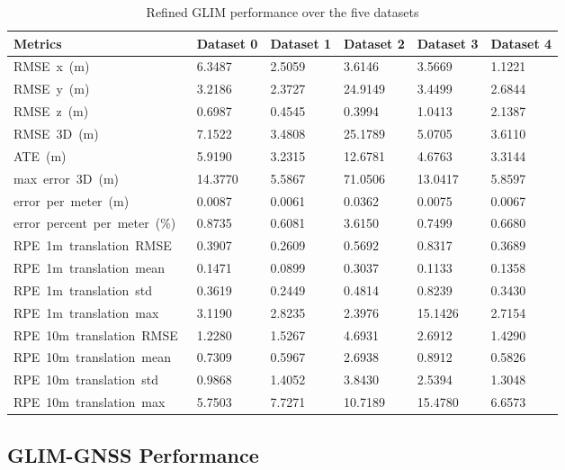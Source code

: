 \begin{table}[htbp]
\centering
\caption{Refined GLIM performance over the five datasets}
\label{tab:refined_performance}
\begin{tabularx}{\textwidth}{lXXXXX}
\toprule
\textbf{Metrics} & \textbf{Dataset 0} & \textbf{Dataset 1} & \textbf{Dataset 2} & \textbf{Dataset 3} & \textbf{Dataset 4} \\ \midrule
RMSE\ x\ (m)\ & 6.3487 & 2.5059 & 3.6146 & 3.5669 & 1.1221 \\
RMSE\ y\ (m)\ & 3.2186 & 2.3727 & 24.9149 & 3.4499 & 2.6844 \\
RMSE\ z\ (m)\ & 0.6987 & 0.4545 & 0.3994 & 1.0413 & 2.1387 \\
RMSE\ 3D\ (m)\ & 7.1522 & 3.4808 & 25.1789 & 5.0705 & 3.6110 \\
ATE\ (m)\ & 5.9190 & 3.2315 & 12.6781 & 4.6763 & 3.3144 \\
max\ error\ 3D\ (m)\ & 14.3770 & 5.5867 & 71.0506 & 13.0417 & 5.8597 \\
error\ per\ meter\ (m)\ & 0.0087 & 0.0061 & 0.0362 & 0.0075 & 0.0067 \\
error\ percent\ per\ meter\ (\%)\ & 0.8735 & 0.6081 & 3.6150 & 0.7499 & 0.6680 \\
RPE\ 1m\ translation\ RMSE\ & 0.3907 & 0.2609 & 0.5692 & 0.8317 & 0.3689 \\
RPE\ 1m\ translation\ mean\ & 0.1471 & 0.0899 & 0.3037 & 0.1133 & 0.1358 \\
RPE\ 1m\ translation\ std\ & 0.3619 & 0.2449 & 0.4814 & 0.8239 & 0.3430 \\
RPE\ 1m\ translation\ max\ & 3.1190 & 2.8235 & 2.3976 & 15.1426 & 2.7154 \\
RPE\ 10m\ translation\ RMSE\ & 1.2280 & 1.5267 & 4.6931 & 2.6912 & 1.4290 \\
RPE\ 10m\ translation\ mean\ & 0.7309 & 0.5967 & 2.6938 & 0.8912 & 0.5826 \\
RPE\ 10m\ translation\ std\ & 0.9868 & 1.4052 & 3.8430 & 2.5394 & 1.3048 \\
RPE\ 10m\ translation\ max\ & 5.7503 & 7.7271 & 10.7189 & 15.4780 & 6.6573 \\ \bottomrule
\end{tabularx}
\end{table}


\subsection{GLIM-GNSS Performance}


